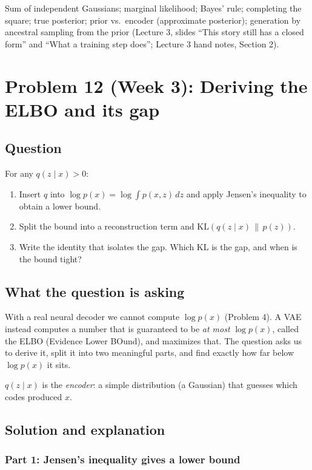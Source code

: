 \documentclass[12pt,a4paper]{article}
\begin{document}
Sum of independent Gaussians; marginal likelihood; Bayes' rule; completing the square; true posterior; prior vs.\ encoder (approximate posterior); generation by ancestral sampling from the prior (Lecture 3, slides ``This story still has a closed form'' and ``What a training step does''; Lecture 3 hand notes, Section 2).

\section{Problem 12 (Week 3): Deriving the ELBO and its gap}

\subsection{Question}

For any $q(z \mid x) > 0$:

\begin{enumerate}[leftmargin=*]
\item Insert $q$ into $\log p(x) = \log \int p(x, z)\, dz$ and apply Jensen's inequality to obtain a lower bound.
\item Split the bound into a reconstruction term and $\mathrm{KL}(q(z \mid x)\,\|\,p(z))$.
\item Write the identity that isolates the gap. Which KL is the gap, and when is the bound tight?
\end{enumerate}

\subsection{What the question is asking}

With a real neural decoder we cannot compute $\log p(x)$ (Problem 4). A VAE instead computes a number that is guaranteed to be \emph{at most} $\log p(x)$, called the ELBO (Evidence Lower BOund), and maximizes that. The question asks us to derive it, split it into two meaningful parts, and find exactly how far below $\log p(x)$ it sits.

$q(z \mid x)$ is the \emph{encoder}: a simple distribution (a Gaussian) that guesses which codes produced $x$.

\subsection{Solution and explanation}

\subsubsection{Part 1: Jensen's inequality gives a lower bound}
\end{document}
